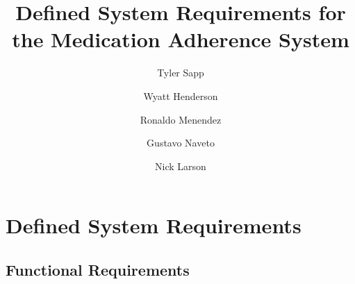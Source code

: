 \documentclass[
  12pt,
]{article}
\title{Defined System Requirements for the Medication Adherence System}
\author{Tyler Sapp \and Wyatt Henderson \and Ronaldo
Menendez \and Gustavo Naveto \and Nick Larson}
\date{}
\renewcommand*\contentsname{Table of contents}
\newcommand\contentsname{Table of contents}
\begin{document}
\maketitle

\renewcommand*\contentsname{Table of contents}
{
\hypersetup{linkcolor=}
\setcounter{tocdepth}{3}
\tableofcontents
}

\section{Defined System Requirements}\label{defined-system-requirements}

\subsection{Functional Requirements}\label{functional-requirements}
\end{document}

